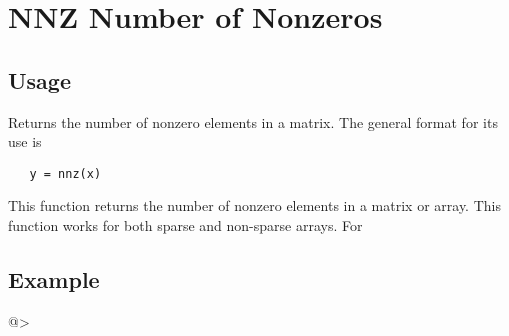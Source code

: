 \section{NNZ Number of Nonzeros
}

\subsection{Usage}

Returns the number of nonzero elements in a matrix.
The general format for its use is
\begin{verbatim}
   y = nnz(x)
\end{verbatim}
This function returns the number of nonzero elements
in a matrix or array.  This function works for both
sparse and non-sparse arrays.  For 
\subsection{Example}

@>
